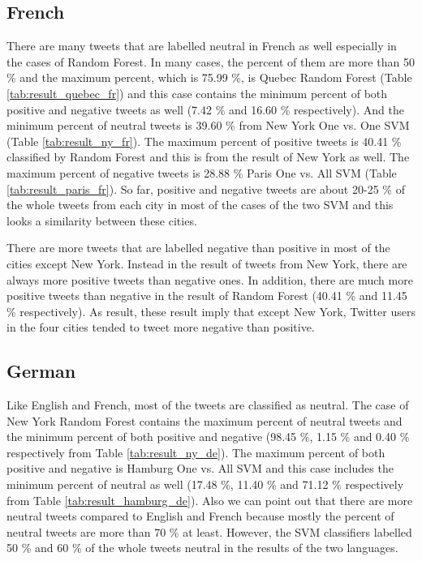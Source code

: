 \subsection{French}
There are many tweets that are labelled neutral in French as well especially in the cases of Random Forest.
In many cases, the percent of them are more than 50 \% and the maximum percent, which is 75.99 \%, is Quebec Random Forest (Table \ref{tab:result_quebec_fr}) and this case contains the minimum percent of both positive and negative tweets as well (7.42 \% and 16.60 \% respectively).
And the minimum percent of neutral tweets is 39.60 \% from New York One vs. One SVM (Table \ref{tab:result_ny_fr}).
The maximum percent of positive tweets is 40.41 \% classified by Random Forest and this is from the result of New York as well.
The maximum percent of negative tweets is 28.88 \% Paris One vs. All SVM (Table \ref{tab:result_paris_fr}). 
So far, positive and negative tweets are about 20-25 \% of the whole tweets from each city in most of the cases of the two SVM and this looks a similarity between these cities.

There are more tweets that are labelled negative than positive in most of the cities except New York.
Instead in the result of tweets from New York, there are always more positive tweets than negative ones.
In addition, there are much more positive tweets than negative in the result of Random Forest (40.41 \% and 11.45 \% respectively).
As result, these result imply that except New York, Twitter users in the four cities tended to tweet more negative than positive.

\subsection{German}
Like English and French, most of the tweets are classified as neutral.
The case of New York Random Forest contains the maximum percent of neutral tweets and the minimum percent of both positive and negative (98.45 \%, 1.15 \% and 0.40 \% respectively from Table \ref{tab:result_ny_de}).
The maximum percent of both positive and negative is Hamburg One vs. All SVM and this case includes the minimum percent of neutral as well (17.48 \%, 11.40 \% and 71.12 \% respectively from Table \ref{tab:result_hamburg_de}).
Also we can point out that there are more neutral tweets compared to English and French because mostly the percent of neutral tweets are more than 70 \% at least.
However, the SVM classifiers labelled 50 \% and 60 \% of the whole tweets neutral in the results of the two languages.

